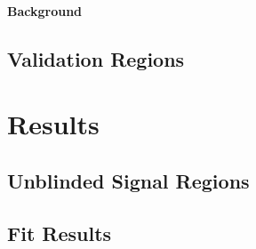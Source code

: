 \subsubsection{Background}
\label{sec:sys_theorybkg}

\section{Validation Regions}


\chapter{Results}
\section{Unblinded Signal Regions}


\section{Fit Results}

